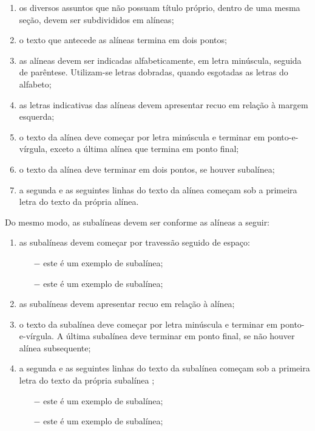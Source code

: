 \documentclass[
        oneside,      %
        english,			
        brazil			 
        ]{configcefetmglpd}
\begin{document}
\begin{enumerate}[label=\alph*)]
	\item os diversos assuntos que não possuam título próprio, dentro de uma mesma seção, devem ser subdivididos em alíneas; 
	\item o texto que antecede as alíneas termina em dois pontos; 
	\item as alíneas devem ser indicadas alfabeticamente, em letra minúscula, seguida de parêntese. Utilizam-se letras dobradas, quando esgotadas as letras do alfabeto;
	\item as letras indicativas das alíneas devem apresentar recuo em relação à margem esquerda;
	\item o texto da alínea deve começar por letra minúscula e terminar em ponto-e-vírgula, exceto a última alínea que termina em ponto final;
	\item o texto da alínea deve terminar em dois pontos, se houver subalínea;
	\item a segunda e as seguintes linhas do texto da alínea começam sob a primeira letra do texto da própria alínea.
\end{enumerate}

Do mesmo modo, as subalíneas devem ser conforme as alíneas a seguir:

\begin{enumerate}[label=\alph*)]
	\item as subalíneas devem começar por travessão seguido de espaço:
	\begin{itemize}
		\item[$-$] este é um exemplo de subalínea;
		\item[$-$] este é um exemplo de subalínea;
	\end{itemize}
	\item as subalíneas devem apresentar recuo em relação à alínea;
	\item o texto da subalínea deve começar por letra minúscula e terminar em ponto-e-vírgula. A última subalínea deve terminar em ponto final, se não houver alínea subsequente;
	\item a segunda e as seguintes linhas do texto da subalínea começam sob a primeira letra do texto da própria subalínea \cite{bib:abnt6027};
	\begin{itemize}
		\item[$-$] este é um exemplo de subalínea;
		\item[$-$] este é um exemplo de subalínea;
	\end{itemize}
\end{enumerate}
\end{document}
